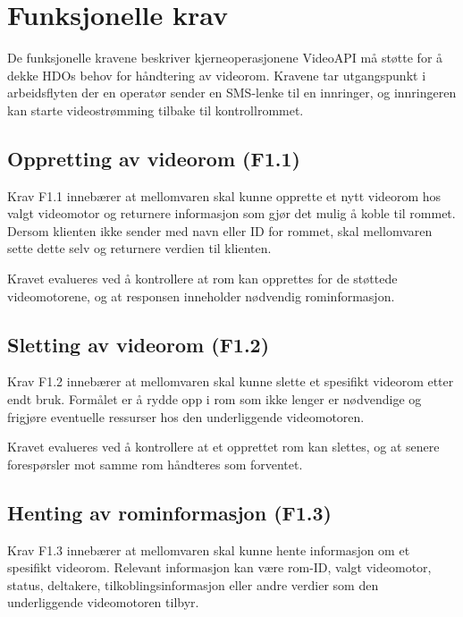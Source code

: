 \section{Funksjonelle krav}
\label{sec:krav-funksjonelle}

De funksjonelle kravene beskriver kjerneoperasjonene VideoAPI må 
støtte for å dekke HDOs behov for håndtering av videorom. Kravene 
tar utgangspunkt i arbeidsflyten der en operatør sender en SMS-lenke 
til en innringer, og innringeren kan starte videostrømming tilbake til 
kontrollrommet.

\subsection{Oppretting av videorom (F1.1)}
\label{subsec:krav-f11}

Krav F1.1 innebærer at mellomvaren skal kunne opprette et nytt 
videorom hos valgt videomotor og returnere informasjon som gjør det 
mulig å koble til rommet. Dersom klienten ikke sender med navn eller 
ID for rommet, skal mellomvaren sette dette selv og returnere verdien 
til klienten.

Kravet evalueres ved å kontrollere at rom kan opprettes for de 
støttede videomotorene, og at responsen inneholder nødvendig 
rominformasjon.

\subsection{Sletting av videorom (F1.2)}
\label{subsec:krav-f12}

Krav F1.2 innebærer at mellomvaren skal kunne slette et spesifikt 
videorom etter endt bruk. Formålet er å rydde opp i rom som ikke 
lenger er nødvendige og frigjøre eventuelle ressurser hos den 
underliggende videomotoren.

Kravet evalueres ved å kontrollere at et opprettet rom kan slettes, 
og at senere forespørsler mot samme rom håndteres som forventet.

\subsection{Henting av rominformasjon (F1.3)}
\label{subsec:krav-f13}

Krav F1.3 innebærer at mellomvaren skal kunne hente informasjon om 
et spesifikt videorom. Relevant informasjon kan være rom-ID, valgt videomotor, status, deltakere, tilkoblingsinformasjon eller andre verdier som den underliggende videomotoren tilbyr.

